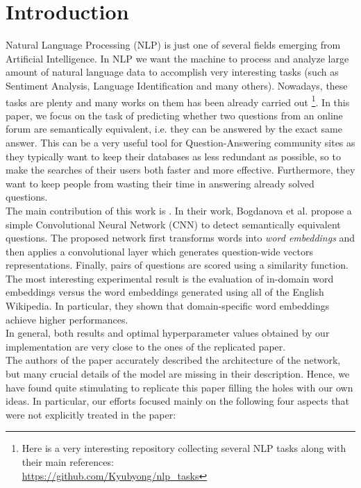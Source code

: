 \documentclass[10pt,twocolumn,letterpaper]{article}
\begin{document}
\section{Introduction}
Natural Language Processing (NLP) is just one of several fields emerging from Artificial Intelligence. In NLP we want the machine to process and analyze large amount of natural language data to accomplish very interesting tasks (such as Sentiment Analysis, Language Identification and many others). Nowadays, these tasks are plenty and many works on them has been already carried out \footnote{Here is a very interesting repository collecting several NLP tasks along with their main references: \\ \url{https://github.com/Kyubyong/nlp_tasks}}. In this paper, we focus on the task of predicting whether two questions from an online forum are semantically equivalent, i.e. they can be answered by the exact same answer. This can be a very useful tool for Question-Answering community sites as they typically want to keep their databases as less redundant as possible, so to make the searches of their users both faster and more effective. Furthermore, they want to keep people from wasting their time in answering already solved questions. \\
The main contribution of this work is \cite{bogdanova2015detecting}. In their work, Bogdanova et al. propose a simple Convolutional Neural Network (CNN) to detect semantically equivalent questions. The proposed network first transforms words into \emph{word embeddings} and then applies a convolutional layer which generates question-wide vectors representations. Finally, pairs of questions are scored using a similarity function. The most interesting experimental result is the evaluation of in-domain word embeddings versus the word embeddings generated using all of the English Wikipedia. In particular, they shown that domain-specific word embeddings achieve higher performances. \\
In general, both results and optimal hyperparameter values obtained by our implementation are very close to the ones of the replicated paper.\\
The authors of the paper accurately described the architecture of the network, but many crucial details of the model are missing in their description. Hence, we have found quite stimulating to replicate this paper filling the holes with our own ideas. In particular, our efforts focused mainly on the following four aspects that were not explicitly treated in the paper: 
\end{document}

